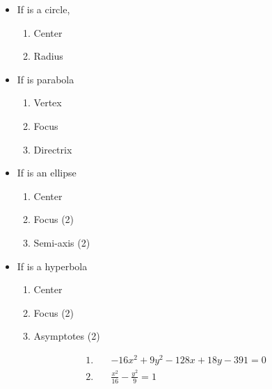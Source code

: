 \documentclass{tufte-handout} %
\begin{document}
\begin{minipage}[c]{0.45\textwidth}
\begin{itemize}
    \item If is a circle,
        \begin{enumerate}
            \item Center
            \item Radius
        \end{enumerate}
    \item If is parabola
        \begin{enumerate}
            \item Vertex
            \item Focus
            \item Directrix
        \end{enumerate}
\end{itemize}
\end{minipage}
\begin{minipage}[c]{0.45\textwidth}
\begin{itemize}
    \item If is an ellipse
        \begin{enumerate}
            \item Center 
            \item Focus (2)
            \item Semi-axis (2)
        \end{enumerate}
    \item If is a hyperbola
        \begin{enumerate}
            \item Center
            \item Focus (2)
            \item Asymptotes (2)
        \end{enumerate}
\end{itemize}


\end{minipage}


\begin{align*}
    1.\quad & -16x^2 + 9y^2 -128x + 18y -391 = 0 \\
    2.\quad & \frac{x^2}{16} - \frac{y^2}{9} = 1
\end{align*}
\end{document}

